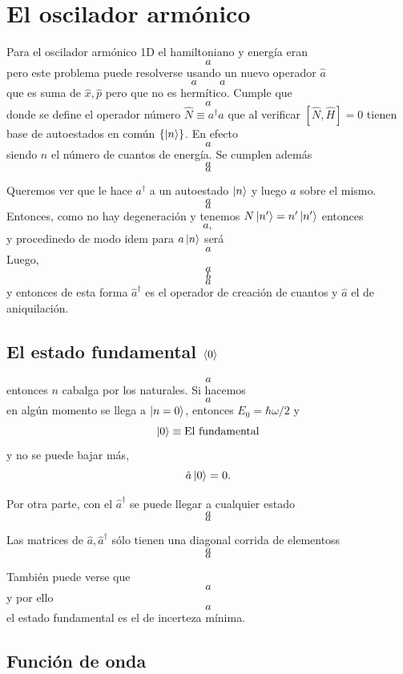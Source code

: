 \documentclass[10pt,oneside]{CBFT_book}
\begin{document}
% 
\section{El oscilador armónico}

Para el oscilador armónico 1D  el hamiltoniano y energía eran
\[
	a
\]
pero este problema puede resolverse usando un nuevo operador $\hat{a}$
\[
	a \qquad a
\]
que es suma de $\hat{x}, \hat{p}$ pero que no es hermítico. Cumple que 
\[
	a
\]
donde se define el operador número $\hat{N}\equiv a^\dagger a$ que al verificar $[\hat{N},\hat{H}]=0$ tienen base de 
autoestados en común $\{ \Ket{n} \}$. En efecto 
\[
	a
\]
siendo $n$ el número de cuantos de energía.
Se cumplen además 
\[
	a
\]
\[
	a
\]

Queremos ver que le  hace $a^\dagger$  a un autoestado $\Ket{n}$ y luego $a$ sobre el mismo.
\[
	a
\]
\[
	a
\]
Entonces, como no hay degeneración y tenemos $N\Ket{n'} = n'\Ket{n'}$ entonces 
\[
	a,
\]
y procedinedo de modo idem para $a\ket{n}$ será
\[
	a
\]
Luego,
\[
	a
\]
\[
	b
\]
\[
	a
\]
y entonces de esta forma $\hat{a}^\dagger$ es el operador de creación de cuantos y $\hat{a}$ el de aniquilación.

\subsection{El estado fundamental $\Braket{0}$}

\[
	a
\]
entonces $n$ cabalga por los naturales.
Si hacemos 
\[
	a
\]
en algún momento se llega a $\Ket{n=0}$, entonces $E_0 = \hbar\omega/2$ y 
\[
	\Ket{0} \equiv \text{El fundamental}
\]
y no se puede bajar más,
\[
	\hat{a}\Ket{0} = 0.
\]

Por otra parte, con el $\hat{a}^\dagger$ se puede llegar a cualquier estado
\[
	a
\]
\[
	a
\]

Las matrices de $\hat{a},\hat{a}^\dagger$ sólo tienen una diagonal corrida de elementoss 
\[
	a
\]
\[
	a
\]

También puede verse que 
\[
	a
\]
y por ello 
\[
	a
\]
el estado fundamental es el de incerteza mínima.

\subsection{Función de onda}
\end{document}
